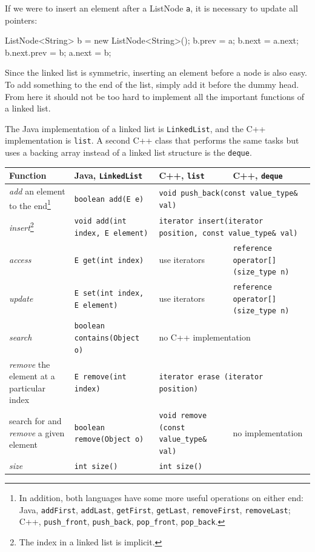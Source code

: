 If we were to insert an element after a ListNode \texttt{a}, it is necessary to update all pointers:

\begin{mylstlisting}
ListNode<String> b = new ListNode<String>();
b.prev = a;
b.next = a.next;
b.next.prev = b;
a.next = b;
\end{mylstlisting}

Since the linked list is symmetric, inserting an element before a node is also easy. To add something to the end of the list, simply add it before the dummy head. From here it should not be too hard to implement all the important functions of a linked list.

The Java implementation of a linked list is \texttt{LinkedList}, and the C++ implementation is \texttt{list}. A second C++ class that performs the same tasks but uses a backing array instead of a linked list structure is the \texttt{deque}.

\begin{center}
    \begin{tabular}{ p{3cm} p{4cm} p{4cm} p{4cm} }
	Function	&	Java, \texttt{LinkedList}	&	C++, \texttt{list} & C++, \texttt{deque} \\
	\hline
\textit{add} an element to the end\footnote{In addition, both languages have some more useful operations on either end: Java, \texttt{addFirst}, \texttt{addLast}, \texttt{getFirst}, \texttt{getLast}, \texttt{removeFirst}, \texttt{removeLast}; C++, \texttt{push\_front}, \texttt{push\_back}, \texttt{pop\_front}, \texttt{pop\_back}.} & \texttt{boolean add(E e)} & \multicolumn{2}{p{8cm}}{\centering \texttt{void push\_back(const value\_type\& val)}} \\
\textit{insert}\footnote{The index in a linked list is implicit.} & \texttt{void add(int index, E element)} & \multicolumn{2}{p{8cm}}{\centering \texttt{iterator insert(iterator position, const value\_type\& val)}} \\
\textit{access} & \texttt{E get(int index)} & use iterators & \texttt{reference operator[] (size\_type n)} \\
\textit{update} & \texttt{E set(int index, E element)} & use iterators & \texttt{reference operator[] (size\_type n)} \\
\textit{search} & \texttt{boolean contains(Object o)} & \multicolumn{2}{p{8cm}}{\centering no C++ implementation} \\
\textit{remove} the element at a particular index & \texttt{E remove(int index)} & \multicolumn{2}{p{8cm}}{\centering \texttt{iterator erase (iterator position)}} \\
search for and \textit{remove} a given element & \texttt{boolean remove(Object o)} & \texttt{void remove (const value\_type\& val)} & no implementation \\
\textit{size} & \texttt{int size()} & \multicolumn{2}{p{8cm}}{\centering \texttt{int size()}} \\
    \end{tabular}
\end{center}

